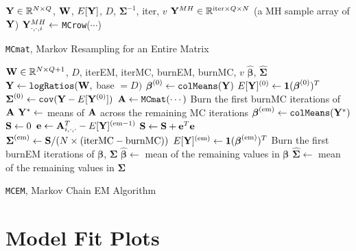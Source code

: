 \documentclass{template}
\begin{document}
\begin{algorithm}[ht!]
\begin{algorithmic}[1]
\Input $\mathbf{Y}\in\mathbb{R}^{N\times Q}$, $\mathbf{W}$, $E[\mathbf{Y}]$, $D$, $\boldsymbol{\Sigma}^{-1}$, iter, $v$
\Output $\mathbf{Y}^{MH}\in\mathbb{R}^{\text{iter}\times Q\times N}$ (a MH sample array of $\mathbf{Y}$)
\State $\mathbf{Y}^{MH}_{\cdot,\cdot,i} \gets$ \texttt{MCrow}($\cdots$)
\EndFor
{}
\end{algorithmic}
\caption{\texttt{MCmat}, Markov Resampling for an Entire Matrix}
\end{algorithm}


\begin{algorithm}[ht!]
\begin{algorithmic}[1]
\Input  $\mathbf{W}\in\mathbb{R}^{N\times Q+1}$, $D$,  iterEM, iterMC, burnEM, burnMC, $v$
\Output $\hat{\boldsymbol{\beta}}$, $\hat{\boldsymbol{\Sigma}}$
\State $\mathbf{Y}\gets \texttt{logRatios}(\mathbf{W},$ base $=D)$
\State $\boldsymbol{\beta}^{(0)} \gets \texttt{colMeans}(\mathbf{Y})$
\State $E[\mathbf{Y}]^{(0)} \gets \mathbf{1}(\boldsymbol{\beta}^{(0)})^T$
\State $\boldsymbol{\Sigma}^{(0)} \gets \texttt{cov}(\mathbf{Y}-E[\mathbf{Y}^{(0)}])$
\State $\mathbf{A}\gets \texttt{MCmat}(\cdots)$
\State Burn the first burnMC iterations of $\mathbf{A}$
\State $\mathbf{Y}^*\gets$ means of $\mathbf{A}$ across the remaining MC iterations
\State $\boldsymbol{\beta}^{(\text{em})} \gets \texttt{colMeans}(\mathbf{Y}^*)$
\State $\mathbf{S}\gets 0$
\State $\mathbf{e}\gets \mathbf{A}_{i,\cdot,\cdot}^T-E[\mathbf{Y}]^{(\text{em}-1)}$
\State $\mathbf{S}\gets \mathbf{S}+\mathbf{e}^T\mathbf{e}$
\EndFor
\State $\boldsymbol{\Sigma}^{(\text{em})}\gets \mathbf{S}/(N\times (\text{iterMC}-\text{burnMC}))$
\State $E[\mathbf{Y}]^{(\text{em})} \gets \mathbf{1}(\boldsymbol{\beta}^{(\text{em})})^T$
\EndFor
\State Burn the first burnEM iterations of $\boldsymbol{\beta}$, $\boldsymbol{\Sigma}$
\State $\hat{\boldsymbol{\beta}}\gets$ mean of the remaining values in $\boldsymbol{\beta}$
\State $\hat{\boldsymbol{\Sigma}}\gets$ mean of the remaining values in $\boldsymbol{\Sigma}$
\end{algorithmic}
\caption{\texttt{MCEM}, Markov Chain EM Algorithm}
\end{algorithm}



\FloatBarrier 
\clearpage
\section{Model Fit Plots}
\end{document}
